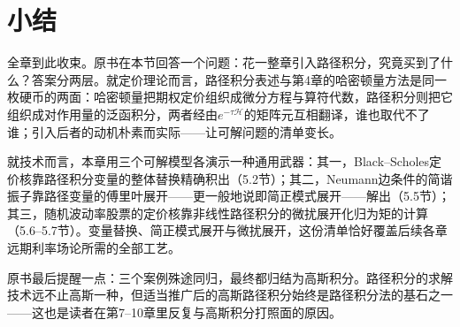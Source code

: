
\section{小结}

全章到此收束。原书在本节回答一个问题：花一整章引入路径积分，究竟买到了什么？答案分两层。就定价理论而言，路径积分表述与第4章的哈密顿量方法是同一枚硬币的两面：哈密顿量把期权定价组织成微分方程与算符代数，路径积分则把它组织成对作用量的泛函积分，两者经由$e^{-\tau\mathcal{H}}$的矩阵元互相翻译，谁也取代不了谁；引入后者的动机朴素而实际——让可解问题的清单变长。

就技术而言，本章用三个可解模型各演示一种通用武器：其一，Black--Scholes定价核靠路径积分变量的整体替换精确积出（5.2节）；其二，Neumann边条件的简谐振子靠路径变量的傅里叶展开——更一般地说即简正模式展开——解出（5.5节）；其三，随机波动率股票的定价核靠非线性路径积分的微扰展开化归为矩的计算（5.6--5.7节）。变量替换、简正模式展开与微扰展开，这份清单恰好覆盖后续各章远期利率场论所需的全部工艺。

原书最后提醒一点：三个案例殊途同归，最终都归结为高斯积分。路径积分的求解技术远不止高斯一种，但适当推广后的高斯路径积分始终是路径积分法的基石之一——这也是读者在第7--10章里反复与高斯积分打照面的原因。

